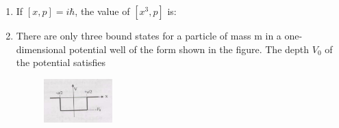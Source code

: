 \documentclass[journal,12pt,onecolumn]{IEEEtran}
\begin{document}
\begin{enumerate}[itemsep = 1em]
\hfill{}

\begin{enumerate}
\end{enumerate}


\item If $[x, p] = i \hbar$, the value of $[x^{3}, p]$ is:

\hfill{}

\begin{enumerate}
\end{enumerate}

\item There are only three bound states for a particle of mass m  in a one-dimensional potential well of the form shown in the figure. The depth $V_0$ of the potential satisfies

\begin{figure}[ht!]
    \centering
    \includegraphics[width=0.25\textwidth]{fig3.jpeg}
    \caption{}
    \label{fig:fig3.jpeg}
\end{figure}

\hfill{}

\begin{enumerate}
{}
\end{enumerate}


\end{enumerate}
\end{document}
